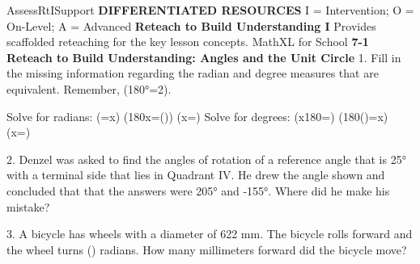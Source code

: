 \documentclass{article}
\newenvironment{te-addendum}[2]{}{}     %
\newcommand{\answer}[1]{}               %
\newcommand{\placeholder}[2]{}          %
\newcommand{\te}[1]{}                   %
\begin{document}
\begin{te-addendum}{Assess}{RtISupport}
\textbf{DIFFERENTIATED RESOURCES}
I = Intervention; O = On-Level; A = Advanced
\textbf{Reteach to Build Understanding I}
Provides scaffolded reteaching for the key lesson concepts.
MathXL for School
\textbf{7-1 Reteach to Build Understanding: Angles and the Unit Circle}
1. Fill in the missing information regarding the radian and degree measures that are equivalent. Remember, (180°=2\pi).
\te{Printed180°=2pi; likely180°=pi.}
Solve for radians:
(=\frac x\pi)
(180x=()\pi)
(x=)
Solve for degrees:
(\frac x{180}=\pi)
(180()=x\pi)
(x=\pi)
\placeholder{graph}{Black circle centered at origin on arrowed x,y axes. Four diagonal radii to45°,135°,225°,315°. Cardinal labels0° and2pi on positive x,pi/2 and90° top,180° andpi left,3pi/2 and270° bottom. Boxed diagonal radian measures pi/4,3pi/4,5pi/4,7pi/4; degree circles45°,135°,225°,315°. Worked conversion boxes at four corners. No ticks.}
\answer{1. (\frac{3\pi}{4}); 45°; 225°; (\frac{7\pi}{4}).}
\te{Conversion boxes: (x=\frac{135\pi}{180}); (x=\frac{180°\frac\pi4}{\pi}=\frac{45\pi}{\pi}); (x=\frac{180°\frac{5\pi}{4}}\pi=\frac{225\pi}\pi); (x=\frac{315\pi}{180}).}
2. Denzel was asked to find the angles of rotation of a reference angle that is 25° with a terminal side that lies in Quadrant IV. He drew the angle shown and concluded that that the answers were 205° and -155°. Where did he make his mistake?
\placeholder{graph}{Black arrowed x,y axes without ticks, black terminal ray in III25° below negative x.}
\answer{2. He drew his angle in Quadrant III.}
3. A bicycle has wheels with a diameter of 622 mm. The bicycle rolls forward and the wheel turns () radians. How many millimeters forward did the bicycle move?
\answer{3. Distance (=(\frac{5\pi}{6})(622)=(\frac{15.708}{6})(622)=(2.618)(622)=1,628.396) mm}
\te{Printed diameter622 but worked solution uses622 as radius; preserved.}
\end{te-addendum}
\end{document}

